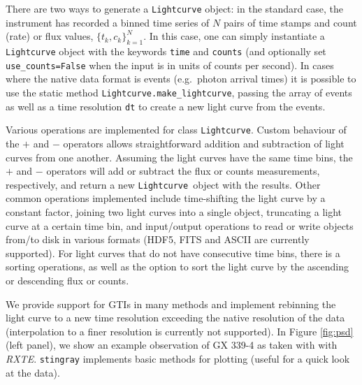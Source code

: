 \documentclass[twocolumn]{aastex62}
\newcommand{\project}[1]{\textsl{#1}\xspace}
\newcommand{\rxte}{\project{RXTE}\xspace}
\newcommand{\stingray}{\texttt{stingray}\xspace}
\newcommand{\lightcurve}{\texttt{Lightcurve}\xspace}
\begin{document}
There are two ways to generate a \texttt{Lightcurve} object: in the standard case, the instrument has recorded a binned time series of $N$ pairs of time stamps and count (rate) or flux values, $\{t_k, c_k \}_{k=1}^{N}$. In this case, one can simply instantiate a \texttt{Lightcurve} object with the keywords \texttt{time} and \texttt{counts} (and optionally set \texttt{use\_counts=False} when the input is in units of counts per second). In cases where the native data format is events (e.g.\ photon arrival times) it is possible to use the static method \texttt{Lightcurve.make\_lightcurve}, passing the array of events as well as a time resolution \texttt{dt} to create a new light curve from the events.

Various operations are implemented for class \lightcurve. Custom behaviour of the $+$ and $-$ operators allows straightforward addition and subtraction of light curves from one another. Assuming the light curves have the same time bins, the $+$ and $-$ operators will add or subtract the flux or counts measurements, respectively, and return a new \lightcurve\ object with the results. Other common operations implemented include time-shifting the light curve by a constant factor, joining two light curves into a single object, truncating a light curve at a certain time bin, and input/output operations to read or write objects from/to disk in various formats (HDF5, FITS and ASCII are currently supported). For light curves that do not have consecutive time bins, there is a sorting operations, as well as the option to sort the light curve by the ascending or descending flux or counts. 

We provide support for GTIs in many methods and implement rebinning the light curve to a new time resolution exceeding the native resolution of the data (interpolation to a finer resolution is currently not supported). In Figure \ref{fig:psd} (left panel), we show an example observation of GX 339-4 as taken with with \rxte.
\stingray implements basic methods for plotting (useful for a quick look at the data).
\end{document}
